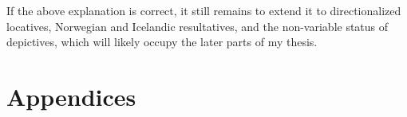\documentclass[letterpaper,12pt]{article}
\begin{document}
If the above explanation is correct, it still remains to extend it to directionalized locatives, Norwegian and Icelandic resultatives, and the non-variable status of depictives, which will likely occupy the later parts of my thesis.

\printbibliography
\section{Appendices}
\begin{refsection}
  \nocite{milway2015generals,milway2013forum,milway2016dogdays}
  \printbibliography
\end{refsection}
\end{document}
